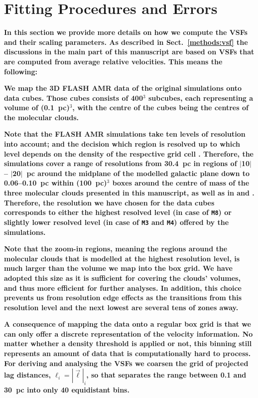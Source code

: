 \section{Fitting Procedures and Errors}\label{appFitting}

\textbf{
    In this section we provide more details on how we compute the VSFs and their scaling parameters.
    As described in Sect.~\ref{methods:vsf} the discussions in the main part of this manuscript are based on VSFs that are computed from average relative velocities. 
    This means the following:
}

\textbf{ 
    We map the 3D FLASH AMR data of the original simulations  onto data cubes. 
    Those cubes consists of 400$^3$ subcubes, each representing a volume of (0.1~pc)$^3$, with the centre of the cubes being the centres of the molecular clouds. 
}

\textbf{
    Note that the FLASH AMR simulations take ten levels of resolution into account; and the decision which region is resolved up to which level depends on the density of the respective grid cell .
    Therefore, the simulations cover a range of resolutions from 30.4~pc in regions of $|$10$|$-- $|$20$|$~pc around the midplane of the modelled galactic plane down to 0.06--0.10~pc within (100~pc)$^3$ boxes around the centre of mass of the three molecular clouds presented in this manuscript, as well as in  and . 
    Therefore, the resolution we have chosen for the data cubes corresponds to either the highest resolved level (in case of \texttt{M8}) or slightly lower resolved level (in case of \texttt{M3} and \texttt{M4}) offered by the simulations.
}

\textbf{
    Note that the zoom-in regions, meaning the regions around the molecular clouds that is modelled at the highest resolution level, is much larger than the volume we map into the box grid. 
    We have adopted this size as it is sufficient for covering the clouds' volumes, and thus more efficient for further analyses. 
    In addition, this choice prevents us from resolution edge effects as the transitions from this resolution level and the next lowest are several tens of zones away. 
}

\textbf{
    A consequence of mapping the data onto a regular box grid is that we can only offer a discrete representation of the velocity information. 
    No matter whether a density threshold is applied or not, this binning still represents an amount of data that is computationally hard to process.
    For deriving and analysing the VSFs we coarsen the grid of projected lag distances, $\ell_i = |\vec{\ell}|_i$, so that separates the range between 0.1 and 30~pc into only 40 equidistant bins.
}

